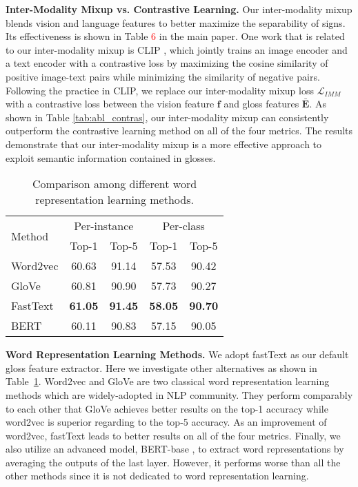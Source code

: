 \documentclass[10pt,twocolumn,letterpaper]{article}
\def \tbf{\textbf}
\begin{document}
\noindent\textbf{Inter-Modality Mixup vs. Contrastive Learning.} Our inter-modality mixup blends vision and language features to better maximize the separability of signs.
Its effectiveness is shown in Table \textcolor{red}{6} in the main paper. One work that is related to our inter-modality mixup is CLIP \cite{clip}, which jointly trains an image encoder and a text encoder with a contrastive loss by maximizing the cosine similarity of positive image-text pairs while minimizing the similarity of negative pairs.
Following the practice in CLIP, we replace our inter-modality mixup loss $\mathcal{L}_{IMM}$ with a contrastive loss between the vision feature $\boldsymbol{f}$ and gloss features $\bar{\boldsymbol{E}}$.
As shown in Table \ref{tab:abl_contras}, our inter-modality mixup can consistently outperform the contrastive learning method on all of the four metrics. The results demonstrate that our inter-modality mixup is a more effective approach to exploit semantic information contained in glosses.



\begin{table}[t]
\centering
\begin{tabular}{l|cc|cc}
\toprule
\multirow{2}{*}{Method} &  \multicolumn{2}{c|}{Per-instance} & \multicolumn{2}{c}{Per-class} \\
& Top-1 & Top-5 & Top-1 & Top-5 \\

\midrule
Word2vec \cite{word2vec} & 60.63 & 91.14 & 57.53 & 90.42 \\
GloVe \cite{glove} & 60.81 & 90.90 & 57.73 & 90.27 \\
FastText \cite{mikolov2018advances} & \tbf{61.05} & \tbf{91.45} & \tbf{58.05} & \tbf{90.70} \\
BERT \cite{kenton2019bert} & 60.11 & 90.83 & 57.15 & 90.05 \\

\bottomrule
\end{tabular}
\caption{Comparison among different word representation learning methods.}
\label{tab:abl_word}
\end{table}

\noindent\textbf{Word Representation Learning Methods.} We adopt fastText \cite{mikolov2018advances} as our default gloss feature extractor. Here we investigate other alternatives as shown in Table~\ref{tab:abl_word}. Word2vec \cite{word2vec} and GloVe \cite{glove} are two classical word representation learning methods which are widely-adopted in NLP community. They perform comparably to each other that GloVe achieves better results on the top-1 accuracy while word2vec is superior regarding to the top-5 accuracy. As an improvement of word2vec, fastText leads to better results on all of the four metrics. Finally, we also utilize an advanced model, BERT-base \cite{kenton2019bert}, to extract word representations by averaging the outputs of the last layer. However, it performs worse than all the other methods since it is not dedicated to word representation learning.
\end{document}
